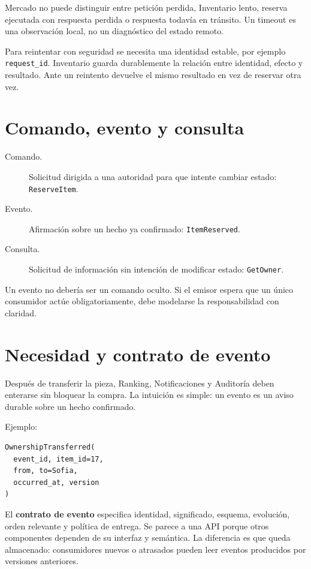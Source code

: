 \documentclass[variant=apuntes,cover=institutional,mode=screen]{ua-engineering-v6-article}
\begin{document}
Mercado no puede distinguir entre petición perdida, Inventario lento, reserva ejecutada con respuesta perdida o respuesta todavía en tránsito. Un timeout es una observación local, no un diagnóstico del estado remoto.

Para reintentar con seguridad se necesita una identidad estable, por ejemplo \texttt{request\_id}. Inventario guarda durablemente la relación entre identidad, efecto y resultado. Ante un reintento devuelve el mismo resultado en vez de reservar otra vez.

\section{Comando, evento y consulta}

\begin{description}
\item[Comando.] Solicitud dirigida a una autoridad para que intente cambiar estado: \texttt{ReserveItem}.
\item[Evento.] Afirmación sobre un hecho ya confirmado: \texttt{ItemReserved}.
\item[Consulta.] Solicitud de información sin intención de modificar estado: \texttt{GetOwner}.
\end{description}

Un evento no debería ser un comando oculto. Si el emisor espera que un único consumidor actúe obligatoriamente, debe modelarse la responsabilidad con claridad.

\section{Necesidad y contrato de evento}

Después de transferir la pieza, Ranking, Notificaciones y Auditoría deben enterarse sin bloquear la compra. La intuición es simple: un evento es un aviso durable sobre un hecho confirmado.

Ejemplo:

\begin{verbatim}
OwnershipTransferred(
  event_id, item_id=17,
  from, to=Sofia,
  occurred_at, version
)
\end{verbatim}

El \textbf{contrato de evento} especifica identidad, significado, esquema, evolución, orden relevante y política de entrega. Se parece a una API porque otros componentes dependen de su interfaz y semántica. La diferencia es que queda almacenado: consumidores nuevos o atrasados pueden leer eventos producidos por versiones anteriores.
\end{document}
